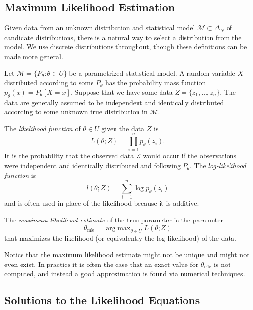 \documentclass[11pt,titlepage]{article}
\newcommand*{\Mod}{\mathcal{M}}
\newcommand*{\mle}{\theta_{\text{mle}}}
\DeclareMathOperator*{\argmax}{arg\ max}
\numberwithin{equation}{section}
\begin{document}
\subsection{Maximum Likelihood Estimation}

    Given data from an unknown distribution and statistical model $\Mod \subset
    \Delta_N$ of candidate distributions, there is a natural way to select a
    distribution from the model.  We use discrete distributions throughout,
    though these definitions can be made more general.

    Let $\Mod = \{P_\theta : \theta \in U\}$ be a parametrized statistical
    model. A random variable $X$ distributed according to some $P_\theta$ has
    the probability mass function $p_\theta(x) = P_\theta[X = x]$.  Suppose that
    we have some data $Z = \{z_1, \ldots, z_n\}$.  The data are generally assumed to
    be independent and identically distributed according to some unknown true
    distribution in $\Mod$.
    
    \begin{definition}
    The \emph{likelihood function} of $\theta \in U$ given the data $Z$ is
    \[
        L(\theta; Z) = \prod_{i=1}^n p_\theta(z_i).
    \]
    It is the probability that the observed data $Z$ would occur if the
    observations were independent and identically distributed and following
    $P_\theta$.  The \emph{log-likelihood function} is
    \[
        l(\theta; Z) = \sum_{i=1}^n \log p_\theta(z_i)
    \]
    and is often used in place of the likelihood because it is additive.
    \end{definition}
    \begin{definition}
    The \emph{maximum likelihood estimate} of the true parameter is the
    parameter 
    \[
        \mle = \argmax_{\theta \in U} L(\theta; Z)
    \]
    that maximizes the likelihood (or equivalently the log-likelihood) of the
    data.
    \end{definition}

    Notice that the maximum likelihood estimate might not be unique and might
    not even exist.  In practice it is often the case that an exact value for
    $\mle$ is not computed, and instead a good approximation is found via
    numerical techniques.

\subsection{Solutions to the Likelihood Equations}
\end{document}
